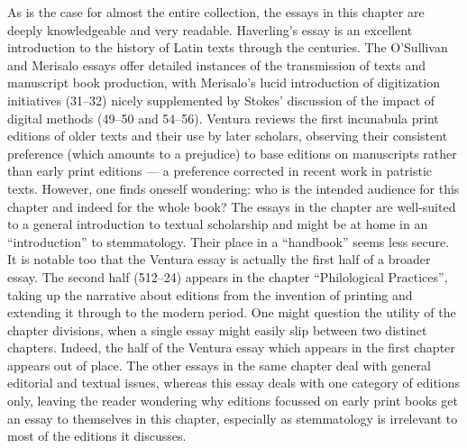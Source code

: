 \begin{review}
As is the case for almost the entire collection, the essays in
this chapter are deeply knowledgeable and very readable. Haverling's
essay is an excellent introduction to the history of Latin texts through
the centuries. The O'Sullivan and Merisalo essays offer detailed
instances of the transmission of texts and manuscript book production,
with Merisalo's lucid introduction of digitization initiatives (31--32)
nicely supplemented by Stokes' discussion of the impact of digital
methods (49--50 and 54--56). Ventura reviews the first incunabula print
editions of older texts and their use by later scholars, observing their
consistent preference (which amounts to a prejudice) to base editions on
manuscripts rather than early print editions –– a preference corrected
in recent work in patristic texts. However, one finds oneself wondering:
who is the intended audience for this chapter and indeed for the whole
book? The essays in the chapter are well-suited to a general
introduction to textual scholarship and might be at home in an
``introduction'' to stemmatology. Their place in a ``handbook'' seems
less secure. It is notable too that the Ventura essay is actually the
first half of a broader essay. The second half (512--24) appears in the
chapter ``Philological Practices'', taking up the narrative about
editions from the invention of printing and extending it through to the
modern period. One might question the utility of the chapter divisions,
when a single essay might easily slip between two distinct chapters.
Indeed, the half of the Ventura essay which appears in the first chapter
appears out of place. The other essays in the same chapter deal with
general editorial and textual issues, whereas this essay deals with one
category of editions only, leaving the reader wondering why editions
focussed on early print books get an essay to themselves in this
chapter, especially as stemmatology is irrelevant to most of the
editions it discusses.


\end{review}
